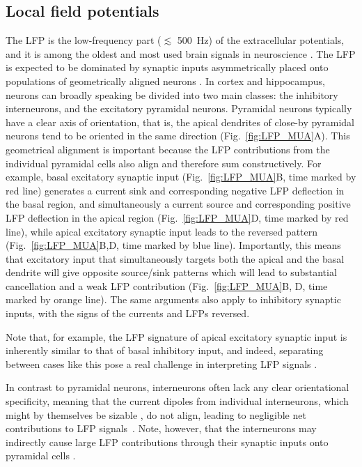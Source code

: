 \documentclass[preprint,11pt,authoryear]{elsarticle}
\newcommand{\hlj}[2][OliveGreen]{ {\sethlcolor{#1} \hl{#2}} }
\newcommand{\hlR}[2][red]{ {\sethlcolor{#1} \hl{#2}} }
\newcommand{\gen}[1]{\color{white}{\hlR{GTE: #1 }}\color{black}}
\newcommand{\tvnnote}[1]{\color{white}{\hlj{TVN: #1 }}\color{black}}
\begin{document}
\subsection{Local field potentials}
The LFP is the low-frequency part ($\lesssim$ 500~Hz) of the extracellular potentials, and it is among the oldest and most used brain signals in neuroscience \citep{Einevoll2013}. The LFP is expected to be dominated by synaptic inputs asymmetrically placed onto populations of geometrically aligned neurons \citep{Nunez2006, Linden2011, Einevoll2013b}.
In cortex and hippocampus, neurons can broadly speaking be divided into two main classes: the inhibitory interneurons, and the excitatory pyramidal neurons. Pyramidal neurons typically have a clear axis of orientation, that is, the apical dendrites of close-by pyramidal neurons tend to be oriented in the same direction (Fig.~\ref{fig:LFP_MUA}A). This geometrical alignment is important because the LFP contributions from the individual pyramidal cells also align and therefore sum constructively.  For example, basal excitatory synaptic input (Fig.~\ref{fig:LFP_MUA}B, time marked by red line) generates a current sink and corresponding negative LFP deflection in the basal region, and simultaneously a current source and corresponding positive LFP deflection in the apical region (Fig.~\ref{fig:LFP_MUA}D, time marked by red line), while apical excitatory synaptic input leads to the reversed pattern (Fig.~\ref{fig:LFP_MUA}B,D, time marked by blue line). 
Importantly, this means that excitatory input that simultaneously targets both the apical and the basal dendrite will give opposite source/sink patterns which will lead to substantial cancellation and a weak LFP contribution (Fig.~\ref{fig:LFP_MUA}B, D, time marked by orange line).
The same arguments also apply to inhibitory synaptic inputs, with the signs of the currents and LFPs reversed. 

Note that, for example, the LFP signature of apical excitatory synaptic input is inherently similar to that of basal inhibitory input, and indeed, separating between cases like this pose a real challenge in interpreting LFP signals \citep{Linden2010}. 

In contrast to pyramidal neurons, interneurons often lack any clear orientational specificity, meaning that the current dipoles from individual interneurons, which might by themselves be sizable \citep{Linden2010}, do not align, leading to negligible net contributions to LFP 
signals~\citep{Mazzoni2015}.
Note, however, that the interneurons may indirectly cause large LFP contributions through their 
synaptic inputs onto pyramidal cells \citep{Telenczuk2016, Hagen2016}.
\end{document}
